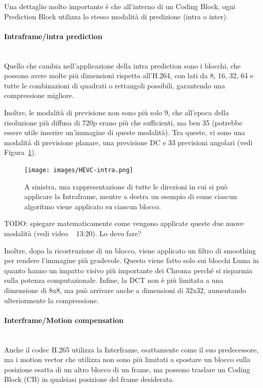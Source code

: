 \documentclass[a4paper,12pt, oneside]{article}
\begin{document}
Una dettaglio molto importante è che all'interno di un Coding Block, ogni Prediction Block utilizza lo
stesso modalità di predizione (intra o inter).

\paragraph{Intraframe/intra prediction}\hphantom{A}\\
Quello che cambia nell'applicazione della intra prediction sono i blocchi, che possono avere molte più
dimensioni rispetto all'H.264, con lati da 8, 16, 32, 64 e tutte le combinazioni di quadrati o rettangoli
possibili, garantendo una compressione migliore.

Inoltre, le modalità di previsione non sono più solo 9, che all'epoca della risoluzione più diffusa di 720p
erano più che sufficienti, ma ben 35 (potrebbe essere utile inserire un'immagine di queste modalità). Tra
queste, vi sono una modalità di previsione planare, una previsione DC e 33 previsioni angolari (vedi
Figura~\ref{fig:HEVC_intra}).

\begin{figure}[h]
    \centering
    \texttt{[image: images/HEVC-intra.png]}
    \caption{A sinistra, una rappresentazione di tutte le direzioni in cui si può applicare la Intraframe,
    mentre a destra un esempio di come ciascun algoritmo viene applicato su ciascun blocco.}
    \label{fig:HEVC_intra}
\end{figure}

TODO: spiegare matematicamente come vengono applicate queste due nuove modalità (vedi video ~ 13:20). Lo devo fare?

Inoltre, dopo la ricostruzione di un blocco, viene applicato un filtro di smoothing per rendere
l'immagine più gradevole. Questo viene fatto solo sui blocchi Luma in quanto hanno un impatto visivo più
importante dei Chroma perché si risparmia sulla potenza computazionale.
Infine, la DCT non è più limitata a una dimensione di 8x8, ma può arrivare anche a dimensioni di 32x32,
aumentando ulteriormente la compressione.

\paragraph{Interframe/Motion compensation}\hphantom{A}\\
Anche il codec H.265 utilizza la Interframe, esattamente come il suo predecessore, ma i motion vector che
utilizza non sono più limitati a spostare un blocco sulla posizione esatta di un altro blocco di un frame,
ma possono traslare un Coding Block (CB) in qualsiasi posizione del frame desiderata.
\end{document}
